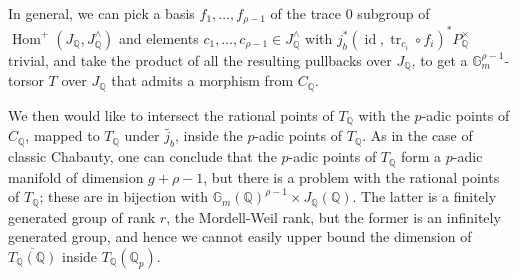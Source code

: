 \documentclass[12pt]{article}
\renewcommand{\G}{\mathbb{G}}
\newcommand{\Q}{\mathbb{Q}}
\DeclareMathOperator{\Hom}{Hom}
\DeclareMathOperator{\id}{id}
\DeclareMathOperator{\tr}{tr}
\theoremstyle{plain}
\theoremstyle{definition}
\theoremstyle{remark}
\begin{document}
In general, we can pick a basis $f_1,\dots,f_{\rho-1}$ of the trace $0$ subgroup of $\Hom^+(J_\Q,J^\wedge_\Q)$ and elements $c_1,\dots,c_{\rho-1} \in J_\Q^\wedge$ with $j_b^* (\id,\tr_{c_i} \circ f_i)^* P_{\Q}^\times$ trivial, and take the product of all the resulting pullbacks over $J_\Q$, to get a $\G_m^{\rho-1}$-torsor $T$ over $J_\Q$ that admits a morphism from $C_\Q$.

We then would like to intersect the rational points of $T_\Q$ with the $p$-adic points of $C_\Q$, mapped to $T_\Q$ under $\tilde{j_b}$, inside the $p$-adic points of $T_\Q$. As in the case of classic Chabauty, one can conclude that the $p$-adic points of $T_\Q$ form a $p$-adic manifold of dimension $g+\rho-1$, but there is a problem with the rational points of $T_\Q$; these are in bijection with $\G_m(\Q)^{\rho-1} \times J_\Q(\Q)$. The latter is a finitely generated group of rank $r$, the Mordell-Weil rank, but the former is an infinitely generated group, and hence we cannot easily upper bound the dimension of $\overline{T_\Q(\Q)}$ inside $T_\Q(\Q_p)$.
\end{document}
